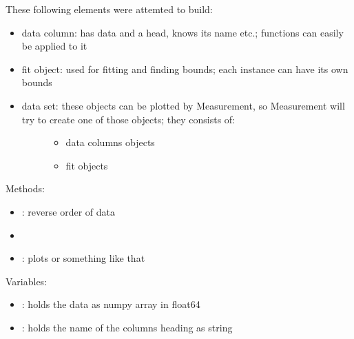\documentclass[letterpaper,10pt,english]{sphinxmanual}
\begin{document}
These following elements were attemted to build:
\begin{itemize}
\item {} 
data column: has data and a head, knows its name etc.; functions can easily be applied to it

\item {} 
fit object: used for fitting and finding bounds; each instance can have its own bounds

\item {} \begin{description}
\item[{data set: these objects can be plotted by Measurement, so Measurement will try to create one of those objects; they consists of:}] \leavevmode\begin{itemize}
\item {} 
data columns objects

\item {} 
fit objects

\end{itemize}

\end{description}

\end{itemize}


Methods:
\begin{itemize}
\item {} 
: reverse order of data

\item {} 

\item {} 
: plots  or something like that

\end{itemize}

Variables:
\begin{itemize}
\item {} 
: holds the data as numpy array in float64

\item {} 
: holds the name of the columns heading as string

\end{itemize}
\end{document}
